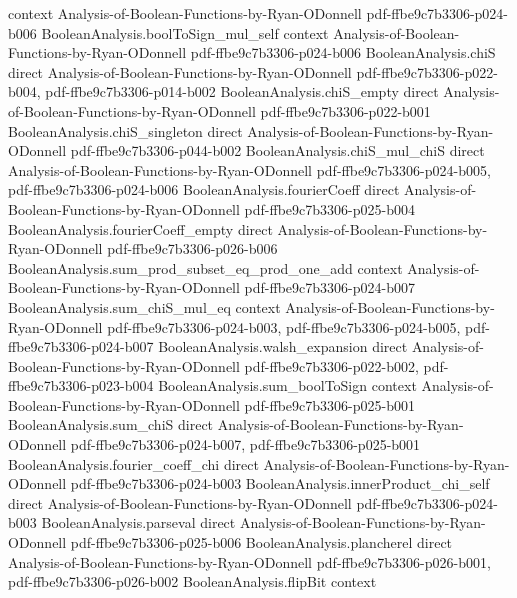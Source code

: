 \begin{theorem}
  {context}
  {Analysis-of-Boolean-Functions-by-Ryan-ODonnell}
  {pdf-ffbe9c7b3306-p024-b006}
\proofstep
  {BooleanAnalysis.boolToSign_mul_self}
  {context}
  {Analysis-of-Boolean-Functions-by-Ryan-ODonnell}
  {pdf-ffbe9c7b3306-p024-b006}
\proofstep
  {BooleanAnalysis.chiS}
  {direct}
  {Analysis-of-Boolean-Functions-by-Ryan-ODonnell}
  {pdf-ffbe9c7b3306-p022-b004,
    pdf-ffbe9c7b3306-p014-b002}
\proofstep
  {BooleanAnalysis.chiS_empty}
  {direct}
  {Analysis-of-Boolean-Functions-by-Ryan-ODonnell}
  {pdf-ffbe9c7b3306-p022-b001}
\proofstep
  {BooleanAnalysis.chiS_singleton}
  {direct}
  {Analysis-of-Boolean-Functions-by-Ryan-ODonnell}
  {pdf-ffbe9c7b3306-p044-b002}
\proofstep
  {BooleanAnalysis.chiS_mul_chiS}
  {direct}
  {Analysis-of-Boolean-Functions-by-Ryan-ODonnell}
  {pdf-ffbe9c7b3306-p024-b005,
    pdf-ffbe9c7b3306-p024-b006}
\proofstep
  {BooleanAnalysis.fourierCoeff}
  {direct}
  {Analysis-of-Boolean-Functions-by-Ryan-ODonnell}
  {pdf-ffbe9c7b3306-p025-b004}
\proofstep
  {BooleanAnalysis.fourierCoeff_empty}
  {direct}
  {Analysis-of-Boolean-Functions-by-Ryan-ODonnell}
  {pdf-ffbe9c7b3306-p026-b006}
\proofstep
  {BooleanAnalysis.sum_prod_subset_eq_prod_one_add}
  {context}
  {Analysis-of-Boolean-Functions-by-Ryan-ODonnell}
  {pdf-ffbe9c7b3306-p024-b007}
\proofstep
  {BooleanAnalysis.sum_chiS_mul_eq}
  {context}
  {Analysis-of-Boolean-Functions-by-Ryan-ODonnell}
  {pdf-ffbe9c7b3306-p024-b003,
    pdf-ffbe9c7b3306-p024-b005,
    pdf-ffbe9c7b3306-p024-b007}
\proofstep
  {BooleanAnalysis.walsh_expansion}
  {direct}
  {Analysis-of-Boolean-Functions-by-Ryan-ODonnell}
  {pdf-ffbe9c7b3306-p022-b002,
    pdf-ffbe9c7b3306-p023-b004}
\proofstep
  {BooleanAnalysis.sum_boolToSign}
  {context}
  {Analysis-of-Boolean-Functions-by-Ryan-ODonnell}
  {pdf-ffbe9c7b3306-p025-b001}
\proofstep
  {BooleanAnalysis.sum_chiS}
  {direct}
  {Analysis-of-Boolean-Functions-by-Ryan-ODonnell}
  {pdf-ffbe9c7b3306-p024-b007,
    pdf-ffbe9c7b3306-p025-b001}
\proofstep
  {BooleanAnalysis.fourier_coeff_chi}
  {direct}
  {Analysis-of-Boolean-Functions-by-Ryan-ODonnell}
  {pdf-ffbe9c7b3306-p024-b003}
\proofstep
  {BooleanAnalysis.innerProduct_chi_self}
  {direct}
  {Analysis-of-Boolean-Functions-by-Ryan-ODonnell}
  {pdf-ffbe9c7b3306-p024-b003}
\proofstep
  {BooleanAnalysis.parseval}
  {direct}
  {Analysis-of-Boolean-Functions-by-Ryan-ODonnell}
  {pdf-ffbe9c7b3306-p025-b006}
\proofstep
  {BooleanAnalysis.plancherel}
  {direct}
  {Analysis-of-Boolean-Functions-by-Ryan-ODonnell}
  {pdf-ffbe9c7b3306-p026-b001,
    pdf-ffbe9c7b3306-p026-b002}
\proofstep
  {BooleanAnalysis.flipBit}
  {context}

\end{theorem}
